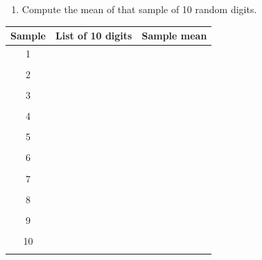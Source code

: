 \documentclass{article}
\begin{document}
\begin{enumerate}
\begin{enumerate}
	\item Compute the mean of that sample of 10 random digits. 
	
	\end{enumerate}

\begin{center}	

\begin{tabular}{|c|c||c|}
\hline
Sample & List of 10 digits & Sample mean \\
\hline
1 & \hspace{3in} & \hspace{1in} \\
&&\\ \hline
2 & \hspace{3in} & \hspace{1in} \\
&&\\ \hline
3 & \hspace{3in} & \hspace{1in} \\
&&\\ \hline
4 & \hspace{3in} & \hspace{1in} \\
&&\\ \hline
5 & \hspace{3in} & \hspace{1in} \\
&&\\ \hline
6 & \hspace{3in} & \hspace{1in} \\
&&\\ \hline
7 & \hspace{3in} & \hspace{1in} \\
&&\\ \hline
8 & \hspace{3in} & \hspace{1in} \\
&&\\ \hline
9 & \hspace{3in} & \hspace{1in} \\
&&\\ \hline
10 & \hspace{3in} & \hspace{1in} \\
&&\\ \hline
\end{tabular}

\end{center}

\end{enumerate}
\end{document}
